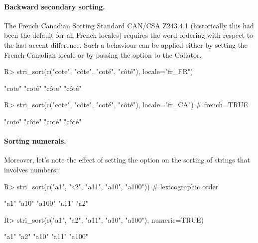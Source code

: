 \documentclass[nojss]{jss}
\begin{document}
%
%
%
%
%
%
%
%




\paragraph{Backward secondary sorting.}
The French Canadian Sorting Standard CAN/CSA Z243.4.1 (historically this had been
the default for all French locales) requires the word ordering with respect
to  the last accent difference. Such a behaviour can be applied
either by setting the French-Canadian locale or by passing the 
option to the Collator.

\begin{Schunk}
\begin{Sinput}
R> stri_sort(c("cote", "côte", "coté", "côté"), locale="fr_FR")
\end{Sinput}
\begin{Soutput}
[1] "cote" "coté" "côte" "côté"
\end{Soutput}
\begin{Sinput}
R> stri_sort(c("cote", "côte", "coté", "côté"), locale="fr_CA") # french=TRUE
\end{Sinput}
\begin{Soutput}
[1] "cote" "côte" "coté" "côté"
\end{Soutput}
\end{Schunk}



\paragraph{Sorting numerals.}
Moreover, let's note the effect of setting the  option on the
sorting of strings that involves numbers:

\begin{Schunk}
\begin{Sinput}
R> stri_sort(c("a1", "a2", "a11", "a10", "a100"))  # lexicographic order
\end{Sinput}
\begin{Soutput}
[1] "a1"   "a10"  "a100" "a11"  "a2"
\end{Soutput}
\begin{Sinput}
R> stri_sort(c("a1", "a2", "a11", "a10", "a100"), numeric=TRUE)
\end{Sinput}
\begin{Soutput}
[1] "a1"   "a2"   "a10"  "a11"  "a100"
\end{Soutput}
\end{Schunk}
\end{document}
